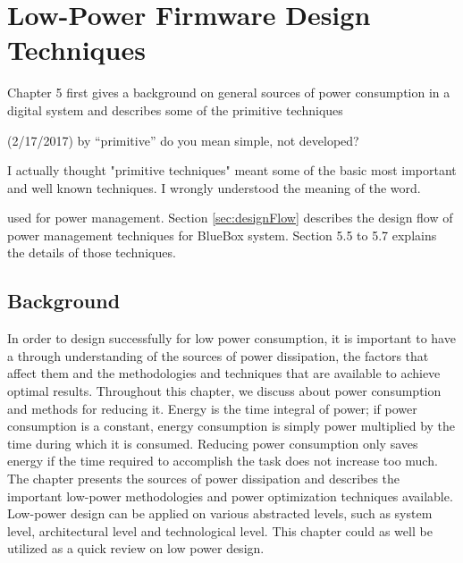 \chapter{Low-Power Firmware Design Techniques}

Chapter 5 first gives a background on general sources of power
consumption in a digital system and describes some of the primitive
techniques
\begin{cmtPai}
	(2/17/2017) by ``primitive'' do you mean simple, not developed?
\end{cmtPai}
\begin{cmtSMS}
	I actually thought "primitive techniques" meant some of the basic most important and well known techniques. 
	I wrongly understood the meaning of the word. 	
\end{cmtSMS}
	
used for power management. Section \ref{sec:designFlow} describes the design flow of
power management techniques for BlueBox system. Section 5.5 to 5.7
explains the details of those techniques.  

\section{Background}

In order to design successfully for low power consumption, it is important to have a through understanding of the sources of power dissipation, the factors that affect them and the methodologies and techniques that are available to achieve optimal results. 
Throughout this chapter, we discuss about power consumption and methods for reducing it. Energy is the time integral of power; if power consumption is a constant, energy consumption is simply power multiplied by the time during which it is consumed. Reducing power consumption only saves energy if the time required to accomplish the task does not increase too much. The chapter presents the sources of power dissipation and describes the important low-power methodologies and power optimization techniques available. Low-power design can be applied on various abstracted levels, such as system level, architectural level and technological level. This chapter could as well be utilized as a quick review on low power design. 

